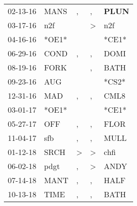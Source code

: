 \begin{supertabular}{p{0.07\textwidth}p{0.06\textwidth}p{0.02\textwidth}p{0.02\textwidth}p{0.06\textwidth}}
          02-13-16\textsuperscript{} &           MANS\textsuperscript{} &                , &                , &  \textbf{PLUN\textsuperscript{}} \\
          03-17-16\textsuperscript{} &            n2f\textsuperscript{} &                  &     \textgreater &            n2f\textsuperscript{} \\
          04-16-16\textsuperscript{} &                            *OE1* &                  &                  &                            *CE1* \\
          06-29-16\textsuperscript{} &           COND\textsuperscript{} &                , &                , &           DOMI\textsuperscript{} \\
          08-19-16\textsuperscript{} &           FORK\textsuperscript{} &                  &                , &           BATH\textsuperscript{} \\
          09-23-16\textsuperscript{} &            AUG\textsuperscript{} &                  &                  &                            *CS2* \\
          12-31-16\textsuperscript{} &            MAD\textsuperscript{} &                , &                , &           CML8\textsuperscript{} \\
          03-01-17\textsuperscript{} &                            *OE1* &                  &                  &                            *CE1* \\
          05-27-17\textsuperscript{} &            OFF\textsuperscript{} &                , &                , &           FLOR\textsuperscript{} \\
          11-04-17\textsuperscript{} &            sfb\textsuperscript{} &                , &                , &           MULL\textsuperscript{} \\
          01-12-18\textsuperscript{} &           SRCH\textsuperscript{} &     \textgreater &     \textgreater &           chfi\textsuperscript{} \\
          06-02-18\textsuperscript{} &           pdgt\textsuperscript{} &                , &     \textgreater &           ANDY\textsuperscript{} \\
          07-14-18\textsuperscript{} &           MANT\textsuperscript{} &                , &                , &           HALF\textsuperscript{} \\
          10-13-18\textsuperscript{} &           TIME\textsuperscript{} &                , &                , &           BATH\textsuperscript{} \\

\end{supertabular}
